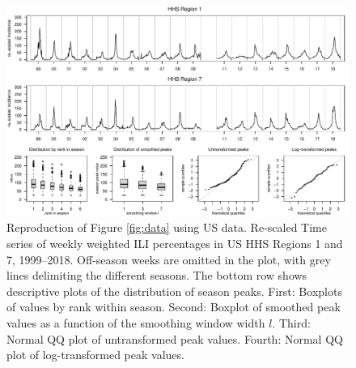 \documentclass{article}
\begin{document}
\begin{figure}[h]
\center
\includegraphics[width=1\textwidth]{figure/plot_data_us.pdf}
\caption{Reproduction of Figure \ref{fig:data} using US data. Re-scaled Time series of weekly weighted ILI percentages in US HHS Regions 1 and 7, 1999--2018. Off-season weeks are omitted in the plot, with grey lines delimiting the different seasons. The bottom row shows descriptive plots of the distribution of season peaks. First: Boxplots of values by rank within season. Second: Boxplot of smoothed peak values as a function of the smoothing window width $l$. Third: Normal QQ plot of untransformed peak values. Fourth: Normal QQ plot of log-transformed peak values.}
\label{fig:data_us}
\end{figure}
\end{document}
